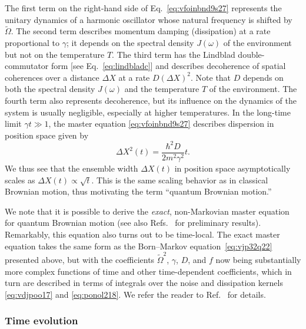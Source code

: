 \documentclass[3p,sort&compress]{elsarticle}
\begin{document}
The first term on the right-hand side of Eq.~\eqref{eq:vfoinbnd9s27} represents the unitary dynamics of a harmonic oscillator whose natural frequency is shifted by $\widetilde{\Omega}$. The second term describes momentum damping (dissipation) at a rate proportional to $\gamma$; it depends on the spectral density $J(\omega)$ of the environment but not on the temperature $T$. The third term has the Lindblad double-commutator form [see Eq.~\eqref{eq:lindbladc}] and describes decoherence of spatial coherences over a distance $\Delta X$ at a rate $D(\Delta X)^2$. Note that $D$ depends on both the spectral density $J(\omega)$ and the temperature $T$ of the environment. The fourth term also represents decoherence, but its influence on the dynamics of the system is usually negligible, especially at higher temperatures. In the long-time limit $\gamma t \gg 1$, the master equation \eqref{eq:vfoinbnd9s27} describes dispersion in position space given by
%
\begin{equation}
  \Delta X^2(t) = \frac{\hbar^2D}{2m^2 \gamma^2} t.
\end{equation}
%
We thus see that the ensemble width $\Delta X(t)$ in position space asymptotically scales as $\Delta X(t) \propto \sqrt{t}$. This is the same scaling behavior as in classical Brownian motion, thus motivating the term ``quantum Brownian motion.'' 

We note that it is possible to derive the \emph{exact}, non-Markovian master equation for quantum Brownian motion \cite{Hu:1992:om} (see also Refs.~\cite{Caldeira:1983:on,Caldeira:1985:tt,Haake:1932:tt,Grabert:1988:bf,Unruh:1989:rc} for preliminary results). Remarkably, this equation also turns out to be time-local. The exact master equation takes the same form as the Born--Markov equation~\eqref{eq:vjp32q22} presented above, but with the coefficients $\widetilde{\Omega}^2$, $\gamma$, $D$, and $f$ now being substantially more complex functions of time and other
time-dependent coefficients, which in turn are described in terms of integrals over the noise and dissipation kernels \eqref{eq:vdjpoo17} and
\eqref{eq:ponol218}. We refer the reader to Ref.~\cite{Hu:1992:om} for details. 

\subsubsection{Time evolution}
\end{document}
